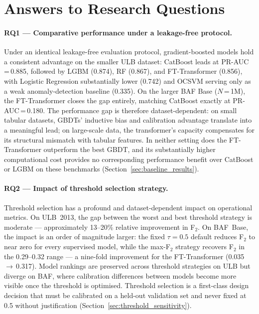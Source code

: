 \section{Answers to Research Questions}
\label{sec:rq_answers}

\paragraph{RQ1 — Comparative performance under a leakage-free protocol.}
Under an identical leakage-free evaluation protocol, gradient-boosted models hold a consistent advantage on the smaller ULB dataset: CatBoost leads at PR-AUC\,=\,0.885, followed by LGBM (0.874), RF (0.867), and FT-Transformer (0.856), with Logistic Regression substantially lower (0.742) and OCSVM serving only as a weak anomaly-detection baseline (0.335). On the larger BAF Base ($N$\,=\,1M), the FT-Transformer closes the gap entirely, matching CatBoost exactly at PR-AUC\,=\,0.180. The performance gap is therefore dataset-dependent: on small tabular datasets, GBDTs' inductive bias and calibration advantage translate into a meaningful lead; on large-scale data, the transformer's capacity compensates for its structural mismatch with tabular features. In neither setting does the FT-Transformer outperform the best GBDT, and its substantially higher computational cost provides no corresponding performance benefit over CatBoost or LGBM on these benchmarks (Section~\ref{sec:baseline_results}).

\paragraph{RQ2 — Impact of threshold selection strategy.}
Threshold selection has a profound and dataset-dependent impact on operational metrics. On ULB~2013, the gap between the worst and best threshold strategy is moderate — approximately 13--20\% relative improvement in F$_2$. On BAF~Base, the impact is an order of magnitude larger: the fixed $\tau=0.5$ default reduces F$_2$ to near zero for every supervised model, while the max-F$_2$ strategy recovers F$_2$ in the 0.29--0.32 range — a nine-fold improvement for the FT-Transformer (0.035\,$\to$\,0.317). Model rankings are preserved across threshold strategies on ULB but diverge on BAF, where calibration differences between models become more visible once the threshold is optimised. Threshold selection is a first-class design decision that must be calibrated on a held-out validation set and never fixed at 0.5 without justification (Section~\ref{sec:threshold_sensitivity}).

